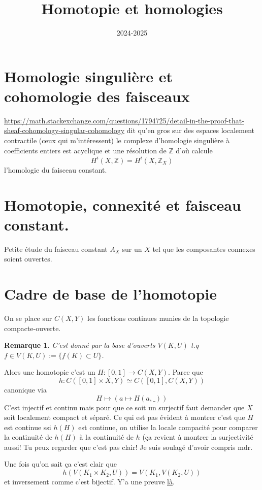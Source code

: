 \documentclass[a4paper,12pt]{book}
\title{Homotopie et homologies}
\date{2024-2025}
\newcommand{\Z}{\mathbb{Z}}
\theoremstyle{plain}
\newtheorem{rem}{Remarque}
\theoremstyle{definition}
\theoremstyle{remark}
\begin{document}
\maketitle
\tableofcontents

\section{Homologie singulière et cohomologie des faisceaux}
\href{Cette ref}{https://math.stackexchange.com/questions/1794725/detail-in-the-proof-that-sheaf-cohomology-singular-cohomology}
dit qu'en gros sur des espaces localement contractile (ceux qui
m'intéressent) le complexe d'homologie singulière à coefficients
entiers est acyclique et une résolution de $\Z$ d'où calcule
\[H^i(X,\Z)=H^i(X,\Z_X)\]
l'homologie du faisceau constant.

\section{Homotopie, connexité et faisceau constant.}
Petite étude du faisceau constant $A_X$ sur un $X$ tel que les
composantes connexes soient ouvertes.


\section{Cadre de base de l'homotopie}
On se place sur $C(X,Y)$ les fonctions continues munies
de la topologie compacte-ouverte. 
\begin{rem}
  C'est donné par la base d'ouverts $V(K,U)$ t.q
  $f\in V(K,U):=\{f(K)\subset U\}$.
\end{rem}
Alors une homotopie
c'est un $H\colon [0,1]\to C(X,Y)$. Parce que
\[h\colon C([0,1]\times X,Y)\simeq C([0,1],C(X,Y))\]
canonique via 
\[H\mapsto (a\mapsto H(a,\_))\]
C'est injectif et continu mais pour que ce soit
un surjectif faut demander que $X$ soit localement
compact et séparé. Ce qui est pas évident
à montrer c'est que $H$ est continue ssi
$h(H)$ est continue, on utilise la locale compacité
pour comparer la continuité de $h(H)$ à la continuité
de $h$ (ça revient à montrer la surjectivité aussi!
Tu peux regarder que c'est pas clair! Je suis
soulagé d'avoir compris mdr.

Une fois qu'on sait ça c'est clair que 
\[h(V(K_1\times K_2,U))=V(K_1,V(K_2,U))\]
et inversement comme c'est bijectif.
Y'a une preuve
\href{https://www.youtube.com/watch?v=N1shTZiP_pA&list=PLKnx70LRf21eSXaawNhiCCPrzsbLdT5do&index=25&t=83s}{là}.
\end{document}
